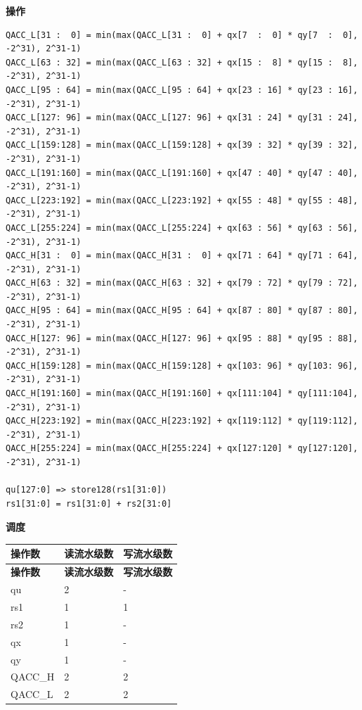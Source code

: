 \textbf{操作}\\
\begin{lstlisting}
QACC_L[31 :  0] = min(max(QACC_L[31 :  0] + qx[7  :  0] * qy[7  :  0], -2^31), 2^31-1)
QACC_L[63 : 32] = min(max(QACC_L[63 : 32] + qx[15 :  8] * qy[15 :  8], -2^31), 2^31-1)
QACC_L[95 : 64] = min(max(QACC_L[95 : 64] + qx[23 : 16] * qy[23 : 16], -2^31), 2^31-1)
QACC_L[127: 96] = min(max(QACC_L[127: 96] + qx[31 : 24] * qy[31 : 24], -2^31), 2^31-1)
QACC_L[159:128] = min(max(QACC_L[159:128] + qx[39 : 32] * qy[39 : 32], -2^31), 2^31-1)
QACC_L[191:160] = min(max(QACC_L[191:160] + qx[47 : 40] * qy[47 : 40], -2^31), 2^31-1)
QACC_L[223:192] = min(max(QACC_L[223:192] + qx[55 : 48] * qy[55 : 48], -2^31), 2^31-1)
QACC_L[255:224] = min(max(QACC_L[255:224] + qx[63 : 56] * qy[63 : 56], -2^31), 2^31-1)
QACC_H[31 :  0] = min(max(QACC_H[31 :  0] + qx[71 : 64] * qy[71 : 64], -2^31), 2^31-1)
QACC_H[63 : 32] = min(max(QACC_H[63 : 32] + qx[79 : 72] * qy[79 : 72], -2^31), 2^31-1)
QACC_H[95 : 64] = min(max(QACC_H[95 : 64] + qx[87 : 80] * qy[87 : 80], -2^31), 2^31-1)
QACC_H[127: 96] = min(max(QACC_H[127: 96] + qx[95 : 88] * qy[95 : 88], -2^31), 2^31-1)
QACC_H[159:128] = min(max(QACC_H[159:128] + qx[103: 96] * qy[103: 96], -2^31), 2^31-1)
QACC_H[191:160] = min(max(QACC_H[191:160] + qx[111:104] * qy[111:104], -2^31), 2^31-1)
QACC_H[223:192] = min(max(QACC_H[223:192] + qx[119:112] * qy[119:112], -2^31), 2^31-1)
QACC_H[255:224] = min(max(QACC_H[255:224] + qx[127:120] * qy[127:120], -2^31), 2^31-1)

qu[127:0] => store128(rs1[31:0])
rs1[31:0] = rs1[31:0] + rs2[31:0]
\end{lstlisting}

\textbf{调度}\\
\begin{longtable}[c]{|l|l|l|}
    \hline
    \rowcolor{lightgray}
    \textbf{操作数} & \textbf{读流水级数} & \textbf{写流水级数} \\\hline
    \endfirsthead
    \hline
    \rowcolor{lightgray}
     \textbf{操作数} & \textbf{读流水级数} & \textbf{写流水级数} \\\hline
    \endhead
    \hline
    \endfoot

    qu & 2 & - \\\hline
    rs1 & 1 & 1 \\\hline
    rs2 & 1 & - \\\hline
     qx & 1 & - \\\hline
     qy & 1 & - \\\hline
     QACC\_H & 2 & 2 \\\hline
     QACC\_L & 2 & 2

\end{longtable}

